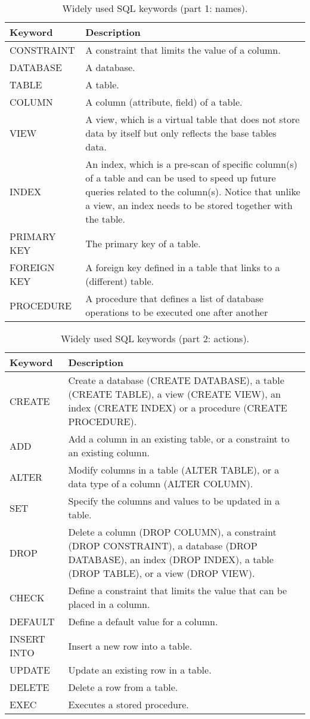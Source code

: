 \begin{table}
	\centering \caption{Widely used SQL keywords (part 1: names).}\label{ch:db:tab:sqlkeywords1}
	\begin{tabularx}{\textwidth}{lX}
		\hline
		Keyword & Description \\ \hline
		CONSTRAINT & A constraint that limits the value of a column. \\ 
		DATABASE & A database. \\ 
		TABLE & A table. \\ 
		COLUMN & A column (attribute, field) of a table. \\ 
		VIEW & A view, which is a virtual table that does not store data by itself but only reflects the base tables data. \\ 
		INDEX & An index, which is a pre-scan of specific column(s) of a table and can be used to speed up future queries related to the column(s). Notice that unlike a view, an index needs to be stored together with the table. \\ 
		PRIMARY KEY & The primary key of a table. \\ 
		FOREIGN KEY & A foreign key defined in a table that links to a (different) table. \\ 
		PROCEDURE & A procedure that defines a list of database operations to be executed one after another \\ \hline
	\end{tabularx}
\end{table}

\begin{table}
	\centering \caption{Widely used SQL keywords (part 2: actions).}\label{ch:db:tab:sqlkeywords2}
	\begin{tabularx}{\textwidth}{lX}
		\hline
		Keyword & Description \\ \hline
		CREATE & Create a database (CREATE DATABASE), a table (CREATE TABLE), a view (CREATE VIEW), an index (CREATE INDEX) or a procedure (CREATE PROCEDURE). \\ 
		ADD & Add a column in an existing table, or a constraint to an existing column. \\ 
		ALTER & Modify columns in a table (ALTER TABLE), or a data type of a column (ALTER COLUMN). \\ 
		SET & Specify the columns and values to be updated in a table. \\ 
		DROP & Delete a column (DROP COLUMN), a constraint (DROP CONSTRAINT), a database (DROP DATABASE), an index (DROP INDEX), a table (DROP TABLE), or a view (DROP VIEW). \\ 
		CHECK & Define a constraint that limits the value that can be placed in a column. \\ 
		DEFAULT & Define a default value for a column. \\ 
		INSERT INTO & Insert a new row into a table. \\ 
		UPDATE & Update an existing row in a table. \\ 
		DELETE & Delete a row from a table. \\ 
		EXEC & Executes a stored procedure. \\ \hline
	\end{tabularx}
\end{table}

